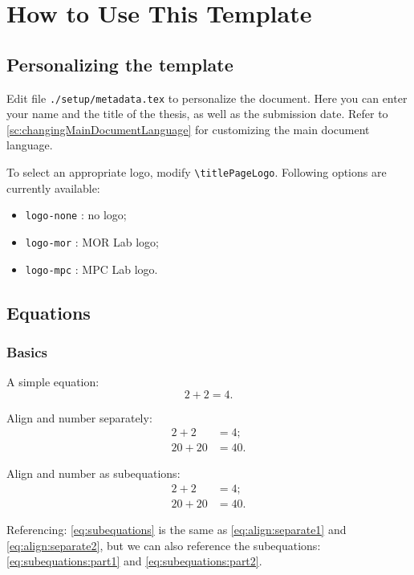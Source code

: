 \section{How to Use This Template}


\subsection{Personalizing the template}
Edit file \verb|./setup/metadata.tex| to personalize the document. Here
you can enter your name and the title of the thesis, as well as the submission
date. Refer to \cref{sc:changingMainDocumentLanguage} for customizing the main
document language.

To select an appropriate logo, modify \verb|\titlePageLogo|. Following options
are currently available:
\begin{itemize}
  \item \verb|logo-none| : no logo;
  \item \verb|logo-mor| : MOR Lab logo;
  \item \verb|logo-mpc| : MPC Lab logo.
\end{itemize}


\subsection{Equations}
\subsubsection{Basics}
A simple equation:
\begin{equation}
  \label{eq:simple}
  2 + 2 = 4.
\end{equation}

Align and number separately:
\begin{align}
  \label{eq:align:separate1}
  2 + 2 &= 4; \\
  \label{eq:align:separate2}
  20 + 20 &= 40.
\end{align}

Align and number as subequations:
\begin{subequations}
  \label{eq:subequations}
  \begin{align}
    \label{eq:subequations:part1}
    2 + 2 &= 4; \\
    \label{eq:subequations:part2}
    20 + 20 &= 40.
  \end{align}
\end{subequations}

Referencing: \cref{eq:subequations} is the same as
\cref{eq:align:separate1} and \cref{eq:align:separate2},
but we can also reference the subequations:
\cref{eq:subequations:part1} and \cref{eq:subequations:part2}.

